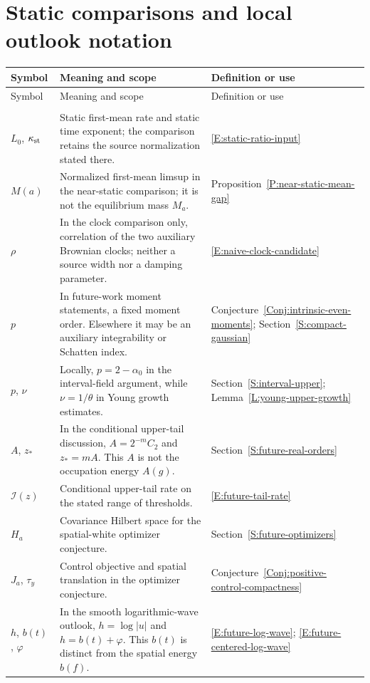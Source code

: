 \section*{Static comparisons and local outlook notation}
\begin{longtable}{@{}>{\raggedright\arraybackslash}p{}
  >{\raggedright\arraybackslash}p{}
  >{\raggedright\arraybackslash}p{}@{}}
  \toprule
  Symbol & Meaning and scope & Definition or use \\
  \midrule
  \endfirsthead
  \toprule
  Symbol & Meaning and scope & Definition or use \\
  \midrule
  \endhead
  \midrule
  \multicolumn{3}{r}{\emph{Continued on the next page}} \\
  \endfoot
  \bottomrule
  \endlastfoot
  $L_0$, $\kappa_{\rm st}$ &
  Static first-mean rate and static time exponent; the comparison retains the
  source normalization stated there. &
  \eqref{E:static-ratio-input} \\[5pt]
  $M(a)$ &
  Normalized first-mean limsup in the near-static comparison; it is not the
  equilibrium mass $M_a$. &
  Proposition~\ref{P:near-static-mean-gap} \\[5pt]
  $\rho$ &
  In the clock comparison only, correlation of the two auxiliary Brownian
  clocks; neither a source width nor a damping parameter. &
  \eqref{E:naive-clock-candidate} \\[5pt]
  $p$ &
  In future-work moment statements, a fixed moment order. Elsewhere it may be an
  auxiliary integrability or Schatten index. &
  Conjecture~\ref{Conj:intrinsic-even-moments}; Section~\ref{S:compact-gaussian}
  \\[5pt]
  $p$, $\nu$ &
  Locally, $p = 2 - \alpha_0$ in the interval-field argument, while $\nu =
  1/\theta$ in Young growth estimates. &
  Section~\ref{S:interval-upper}; Lemma~\ref{L:young-upper-growth} \\[5pt]
  $A$, $z_*$ &
  In the conditional upper-tail discussion, $A = 2^{-m}C_2$ and $z_* = mA$. This
  $A$ is not the occupation energy $A(g)$. &
  Section~\ref{S:future-real-orders} \\[5pt]
  $\mathcal{I}(z)$ &
  Conditional upper-tail rate on the stated range of thresholds. &
  \eqref{E:future-tail-rate} \\[5pt]
  $H_a$ &
  Covariance Hilbert space for the spatial-white optimizer conjecture. &
  Section~\ref{S:future-optimizers} \\[5pt]
  $J_a$, $\tau_y$ &
  Control objective and spatial translation in the optimizer conjecture. &
  Conjecture~\ref{Conj:positive-control-compactness} \\[5pt]
  $h$, $b(t)$, $\varphi$ &
  In the smooth logarithmic-wave outlook, $h = \log|u|$ and $h = b(t)+\varphi$.
  This $b(t)$ is distinct from the spatial energy $b(f)$. &
  \eqref{E:future-log-wave}; \eqref{E:future-centered-log-wave} \\[5pt]
\end{longtable}
\endgroup
